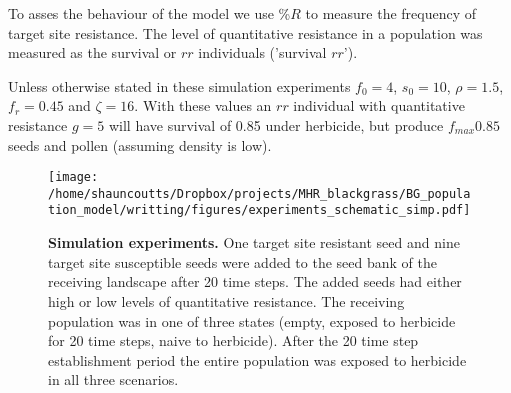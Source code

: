 \documentclass[10pt,letterpaper]{article}
\begin{document}
To asses the behaviour of the model we use \%$R$ to measure the frequency of target site resistance. The level of quantitative resistance in a population was measured as the survival or $rr$ individuals ('survival $rr$').

Unless otherwise stated in these simulation experiments $f_0 = 4$, $s_0 = 10$, $\rho = 1.5$, $f_r = 0.45$ and $\zeta = 16$. With these values an $rr$ individual with quantitative resistance $g = 5$ will have survival of 0.85 under herbicide, but produce $f_{max} 0.85$ seeds and pollen (assuming density is low).

\begin{figure}[!h] 
	\texttt{[image: /home/shauncoutts/Dropbox/projects/MHR\_blackgrass/BG\_population\_model/writting/figures/experiments\_schematic\_simp.pdf]}
\caption{{\bf Simulation experiments.} One target site resistant seed and nine target site susceptible seeds were added to the seed bank of the receiving landscape after 20 time steps. The added seeds had either high or low levels of quantitative resistance. The receiving population was in one of three states (empty, exposed to herbicide for 20 time steps, naive to herbicide). After the 20 time step establishment period the entire population was exposed to herbicide in all three scenarios.} 
\label{fig:exper}
\end{figure}

\end{document}
